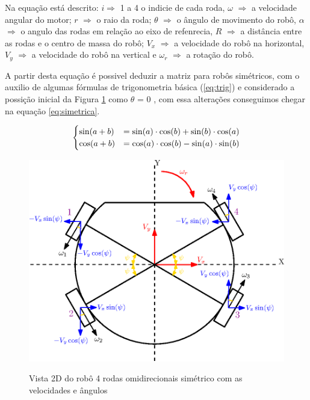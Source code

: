 \documentclass[deposito, acronym, symbols]{fei}
\begin{document}
Na equação está descrito: $i\Rightarrow$  1 a 4 o indicie de cada roda, $\omega$ $\Rightarrow$ a velocidade angular do motor; $r$ $\Rightarrow$ o raio da roda;  $\theta$ $\Rightarrow$ o ângulo de movimento do robô, $\alpha$ $\Rightarrow$ o angulo das rodas em relação ao eixo de refenrecia, $R$ $\Rightarrow$ a distância entre as rodas e o centro de massa do robô; $V_x$ $\Rightarrow$ a velocidade do robô na horizontal, $V_y$ $\Rightarrow$ a velocidade do robô na vertical e $\omega_r$ $\Rightarrow$ a rotação do robô.

A partir desta equação é possivel deduzir a matriz para robôs simétricos, com o auxilio de algumas fórmulas de trigonometria básica (\ref{eq:trig}) e considerado a possição inicial da Figura \ref{fig:cin_simetrica}  como $\theta$ = 0 , com essa alterações conseguimos chegar na equação \ref{eq:simetrica}.

\begin{equation} \label{eq:trig}
\centering  
\begin{cases} \sin(a+b)& = \sin(a)\cdot \cos(b) +\sin(b)\cdot \cos(a) \\
              \cos(a+b)& = \cos(a)\cdot \cos(b) -\sin(a)\cdot \sin(b)  \end{cases}
\end{equation}

\begin{figure}[!htb]
    \centering
    \caption{Vista 2D do robô 4 rodas omidirecionais simétrico com as velocidades e ângulos}
    \includegraphics[scale=1]{Imagens/Omini_wheels_simetric.eps}
    \label{fig:cin_simetrica}
\end{figure}
\end{document}
